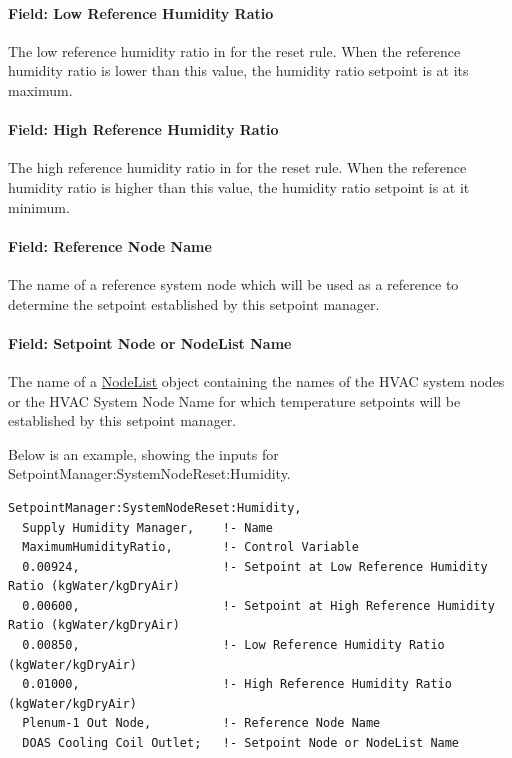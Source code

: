 \paragraph{Field: Low Reference Humidity Ratio}\label{field-low-reference-humidity-ratio}

The low reference humidity ratio in \SI{}{\humidityRatio} for the reset rule. When the reference humidity ratio is lower than this value, the humidity ratio setpoint is at its maximum.

\paragraph{Field: High Reference Humidity Ratio}\label{field-high-reference-humidity-ratio}

The high reference humidity ratio in \SI{}{\humidityRatio} for the reset rule. When the reference humidity ratio is higher than this value, the humidity ratio setpoint is at it minimum.

\paragraph{Field: Reference Node Name}\label{field-reference-node-name-3}

The name of a reference system node which will be used as a reference to determine the setpoint established by this setpoint manager.

\paragraph{Field: Setpoint Node or NodeList Name}\label{field-setpoint-node-or-nodelist-name-23}

The name of a \hyperref[nodelist]{NodeList} object containing the names of the HVAC system nodes or the HVAC System Node Name for which temperature setpoints will be established by this setpoint manager.

Below is an example, showing the inputs for SetpointManager:SystemNodeReset:Humidity.

\begin{lstlisting}
SetpointManager:SystemNodeReset:Humidity,
  Supply Humidity Manager,    !- Name
  MaximumHumidityRatio,       !- Control Variable
  0.00924,                    !- Setpoint at Low Reference Humidity Ratio (kgWater/kgDryAir)
  0.00600,                    !- Setpoint at High Reference Humidity Ratio (kgWater/kgDryAir)
  0.00850,                    !- Low Reference Humidity Ratio (kgWater/kgDryAir)
  0.01000,                    !- High Reference Humidity Ratio (kgWater/kgDryAir)
  Plenum-1 Out Node,          !- Reference Node Name
  DOAS Cooling Coil Outlet;   !- Setpoint Node or NodeList Name
\end{lstlisting}
